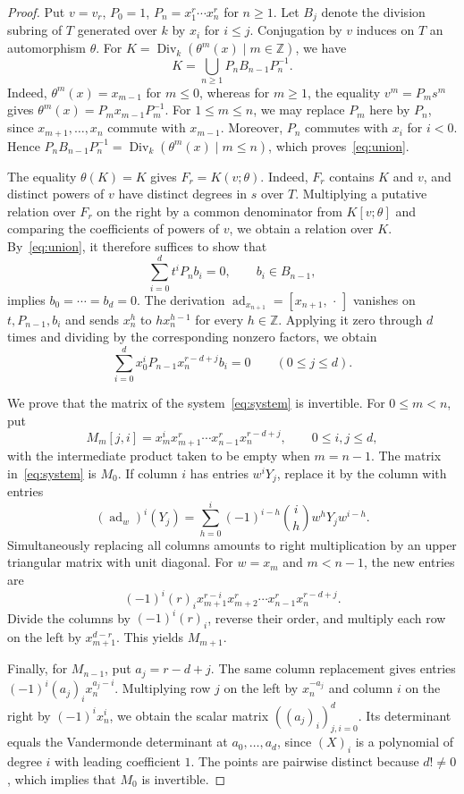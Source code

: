 \documentclass[11pt,a4paper,reqno]{amsart}
\numberwithin{equation}{section}
\theoremstyle{remark}
\newcommand{\Div}{\operatorname{Div}_k}
\newcommand{\ad}{\operatorname{ad}}
\newcommand{\Z}{\mathbb Z}
\begin{document}
\begin{proof}
Put $v=v_r$, $P_0=1$, $P_n=x_1^r\cdots x_n^r$ for $n\ge1$.
Let $B_j$ denote the division subring of $T$ generated over $k$ by
$x_i$ for $i\le j$. Conjugation by $v$ induces on $T$
an automorphism $\theta$. For
$K=\Div(\theta^m(x)\mid m\in\Z)$, we have
\begin{equation}\label{eq:union}
 K=\bigcup_{n\ge1}P_n B_{n-1}P_n^{-1}.
\end{equation}
Indeed, $\theta^m(x)=x_{m-1}$ for $m\le0$, whereas for $m\ge1$,
the equality $v^m=P_m s^m$ gives
$\theta^m(x)=P_m x_{m-1}P_m^{-1}$. For $1\le m\le n$, we may
replace $P_m$ here by $P_n$, since $x_{m+1},\ldots,x_n$
commute with $x_{m-1}$. Moreover, $P_n$ commutes with $x_i$
for $i<0$. Hence
$P_nB_{n-1}P_n^{-1}=\Div(\theta^m(x)\mid m\le n)$,
which proves~\eqref{eq:union}.

The equality $\theta(K)=K$ gives $F_r=K(v;\theta)$. Indeed,
$F_r$ contains $K$ and $v$, and distinct powers of $v$ have distinct
degrees in $s$ over $T$. Multiplying a putative relation over $F_r$ on the right
by a common denominator from $K[v;\theta]$ and comparing the coefficients of
powers of $v$, we obtain a relation over $K$. By~\eqref{eq:union},
it therefore suffices to show that
\[
 \sum_{i=0}^d t^i P_n b_i=0,\qquad b_i\in B_{n-1},
\]
implies $b_0=\cdots=b_d=0$. The derivation
$\ad_{x_{n+1}}=[x_{n+1},\,\cdot\,]$ vanishes on
$t,P_{n-1},b_i$ and sends $x_n^h$ to $h x_n^{h-1}$ for every
$h\in\Z$. Applying it zero through $d$ times and dividing by
the corresponding nonzero factors, we obtain
\begin{equation}\label{eq:system}
 \sum_{i=0}^d x_0^i P_{n-1}x_n^{r-d+j}b_i=0
 \qquad(0\le j\le d).
\end{equation}

We prove that the matrix of the system~\eqref{eq:system} is invertible. For $0\le m<n$,
put
\[
 M_m[j,i]=x_m^i x_{m+1}^r\cdots x_{n-1}^r x_n^{r-d+j},
 \qquad 0\le i,j\le d ,
\]
with the intermediate product taken to be empty when $m=n-1$.
The matrix in~\eqref{eq:system} is $M_0$.
If column $i$ has entries $w^iY_j$, replace it
by the column with entries
\[
 (\ad_w)^i(Y_j)=\sum_{h=0}^i(-1)^{i-h}\binom ih w^hY_jw^{i-h}.
\]
Simultaneously replacing all columns amounts to right multiplication by an upper
triangular matrix with unit diagonal. For $w=x_m$ and $m<n-1$,
the new entries are
\[
 (-1)^i(r)_i x_{m+1}^{r-i}
 x_{m+2}^r\cdots x_{n-1}^r x_n^{r-d+j}.
\]
Divide the columns by $(-1)^i(r)_i$, reverse their order, and multiply
each row on the left by $x_{m+1}^{d-r}$. This yields $M_{m+1}$.

Finally, for $M_{n-1}$, put $a_j=r-d+j$. The same column replacement
gives entries $(-1)^i(a_j)_i x_n^{a_j-i}$. Multiplying row $j$ on the left
by $x_n^{-a_j}$ and column $i$ on the right by $(-1)^ix_n^i$,
we obtain the scalar matrix $((a_j)_i)_{j,i=0}^d$.
Its determinant equals the Vandermonde determinant at $a_0,\ldots,a_d$,
since $(X)_i$ is a polynomial of degree $i$ with leading coefficient $1$.
The points are pairwise distinct because $d!\ne0$, which implies that $M_0$ is invertible.
\end{proof}
\end{document}
